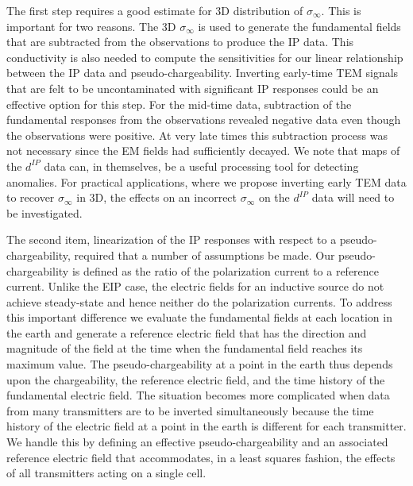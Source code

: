 \documentclass[extra,mreferee]{gji}
\newcommand{\siginf}{\sigma_\infty}
\begin{document}
The first step requires a good estimate for 3D distribution of $\siginf$. This is important for two reasons. The 3D $\siginf$ is used to generate the fundamental fields that are subtracted from the observations to produce the IP data. This conductivity is also needed to compute the sensitivities for our linear relationship between the IP data and pseudo-chargeability. Inverting early-time TEM signals that are felt to be uncontaminated with significant IP responses could be an effective option for this step.
For the mid-time data, subtraction of the fundamental responses from the observations revealed negative data even though the observations were positive. At very late times this subtraction process was not necessary since the EM fields had sufficiently decayed.
We note that maps of the $d^{IP}$ data can, in themselves, be a useful processing tool for detecting anomalies. For practical applications, where we propose inverting early TEM data to recover $\siginf$ in 3D, the effects on an incorrect $\siginf$ on the $d^{IP}$ data will need to be investigated.


The second item, linearization of the IP responses with respect to a pseudo-chargeability, required that a number of assumptions be made. Our pseudo-chargeability is defined as the ratio of the polarization current to a reference current. Unlike the EIP case, the electric fields for an inductive source do not achieve steady-state and hence neither do the polarization currents. To address this important difference we evaluate the fundamental fields at each location in the earth and generate a reference electric field that has the direction and magnitude of the field at the time when the fundamental field  reaches its maximum value. The pseudo-chargeability at a point in the earth thus depends upon the chargeability, the reference electric field, and the time history of the fundamental electric field. The situation becomes more complicated when data from many transmitters are to be inverted simultaneously because the time history of the electric field at a point in the earth is different for each transmitter. We handle this by defining an effective pseudo-chargeability and an associated reference electric field that accommodates, in a least squares fashion, the effects of all transmitters acting on a single cell.
\end{document}
